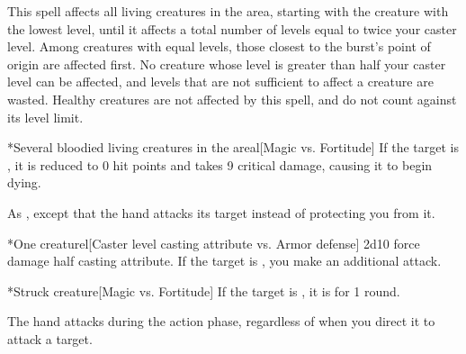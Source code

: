 \spellline
\spelleffect This spell affects all \bloodied living creatures in the area, starting with the creature with the lowest level, until it affects a total number of levels equal to twice your caster level. Among creatures with equal levels, those closest to the burst's point of origin are affected first. No creature whose level is greater than half your caster level can be affected, and levels that are not sufficient to affect a creature are wasted. Healthy creatures are not affected by this spell, and do not count against its level limit.
\begin{spelltargets}*{Several bloodied living creatures in the area}l[Magic vs. Fortitude]
    \spellsuccess If the target is \bloodied, it is reduced to 0 hit points and takes 9 critical damage, causing it to begin dying.
\end{spelltargets}
\spellline
{}

\spellrng{\rngmed}
\spelldur{\durshort \dismissable}
\spellline
\spelleffect As , except that the hand attacks its target instead of protecting you from it.
\begin{spelltarget}*{One creature}l[Caster level \add casting attribute vs. Armor defense]
    \spellsuccess 2d10 force damage \add half casting attribute. If the target is \bloodied, you make an additional attack.
    \begin{spelltarget}*{Struck creature}[Magic vs. Fortitude]
        \spellsuccess If the target is \bloodied, it is \dazed for 1 round.
    \end{spelltarget}
\end{spelltarget}
\spellnotes The hand attacks during the action phase, regardless of when you direct it to attack a target.

